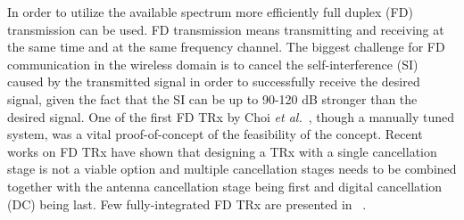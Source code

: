 \documentclass[onecolumn,draftcls,journal]{IEEEtran}
\begin{document}
In order to utilize the available spectrum more efficiently full duplex (FD) transmission can be used. FD transmission means
transmitting and receiving at the same time and at the same frequency channel.  
The biggest challenge for FD communication in the wireless domain is to cancel the
self-interference (SI) caused by the transmitted signal in order to successfully receive the desired signal, given the fact that the SI can be up to 90-120 dB stronger than the desired signal.
One of the first FD TRx by Choi {\it et al.}~\cite{Choi_Jain_Srinivasan_etal-10}, though a manually tuned system,   was a vital proof-of-concept of the feasibility of the concept. 
Recent works \cite{bharadia_katti,Durate_Sabharwal,sahai_patel_sabharwal}  on FD TRx have shown that designing a TRx with a single cancellation stage is not a viable option and multiple cancellation stages needs to be combined together with  the antenna cancellation stage being first and digital cancellation (DC) being last. 
Few fully-integrated FD TRx are presented in ~\cite{Debaillie2014,Broek2015,Dinc2015,Zhou2015}. 

\end{document}
